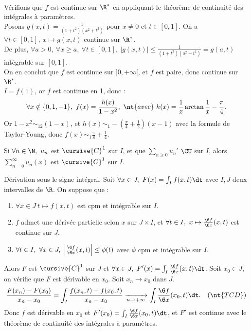 \documentclass[11pt]{article}
\begin{document}
\begin{ex}{}{}
\begin{align*}
    \end{align*}
     Vérifions que $f$ est continue sur $\R^*$ en appliquant le théorème de continuité des intégrales à paramètres.\\
    Posons $g(x,t)=\frac{1}{(1+t^2)(x^2+t^2)}$ pour $x\neq0$ et $t\in[0,1]$. On a $\forall t \in [0,1], ~ x\mapsto g(x,t)$ continue sur $\R^*$.\\
    De plus, $\forall a > 0, ~ \forall x \geq a, ~ \forall t \in [0,1], ~ |g(x,t)|\leq\frac{1}{(1+t^2)(a^2+t^2)}=g(a,t)$ intégrable sur $[0,1]$.\\
    On en conclut que $f$ est continue sur $]0,+\infty[$, et $f$ est paire, donc continue sur $\R^*$.\\
     $I=f(1)$, or $f$ est continue en 1, donc :
    \begin{equation*}
        \forall x \notin \{0,1,-1\}, ~ f(x)=\frac{h(x)}{1-x^2}, ~ \nt{avec} ~ h(x)=\frac{1}{x}\arctan\frac{1}{x}-\frac{\pi}{4}.
    \end{equation*}
    Or $1-x^2\sim_12(1-x)$, et $h(x)\sim_1-\left( \frac{\pi}{4} + \frac{1}{2} \right)(x-1)$ avec la formule de Taylor-Young, donc $f(x)\sim_1\frac{\pi}{8}+\frac{1}{4}$.
\end{ex}

\begin{rappel}{}{}
    Si $\forall n \in \N, ~ u_n$ est $\cursive{C}^1$ sur $I$, et que $\sum_{n\geq0}u_n'$ $\CU$ sur $I$, alors $\sum_{n=0}^\infty u_n(x)$ est $\cursive{C}^1$ sur $I$.
\end{rappel}

\begin{thm}{Dérivation sous le signe intégral.}{}
    Soit $\forall x\in J, ~ F(x)=\int_I f(x,t)\dt$ avec $I,J$ deux intervalles de $\R$. On suppose que :
    \begin{enumerate}
        \item $\forall x \in J ~ t\mapsto f(x,t)$ est cpm et intégrable sur $I$.
        \item $f$ admet une dérivée partielle selon $x$ sur $J\times I$, et $\forall t \in I, ~ x\mapsto\frac{\6 f}{\6 x}(x,t)$ est continue sur $J$.
        \item $\forall t \in I, ~ \forall x \in J, ~ \left|\frac{\6 f}{\6 x}(x,t)\right|\leq\phi(t)$ avec $\phi$ cpm et intégrable sur $I$.
    \end{enumerate}
    Alors $F$ est $\cursive{C}^1$ sur $J$ et $\forall x \in J, ~ F'(x)=\int_I\frac{\6 f}{\6 x}(x,t)\dt$.
    \tcblower
    Soit $x_0\in J$, on vérifie que $F$ est dérivable en $x_0$. Soit $x_n\to x_0$ dans $J$.
    \begin{equation*}
        \frac{F(x_n)-F(x_0)}{x_n-x_0} = \int_I \frac{f(x_n,t) - f(x_0,t)}{x_n - x_0} \xrightarrow[n\to+\infty]{} \int_I \frac{\6 f}{\6 x}(x_0, t)\dt. \quad (\nt{TCD})
    \end{equation*}
    Donc $f$ est dérivable en $x_0$ et $F'(x_0)=\int_I\frac{\6 f}{\6 x}(x_0,t)\dt$, et $F'$ est continue avec le théorème de continuité des intégrales à paramètres.
\end{thm}
\end{document}
